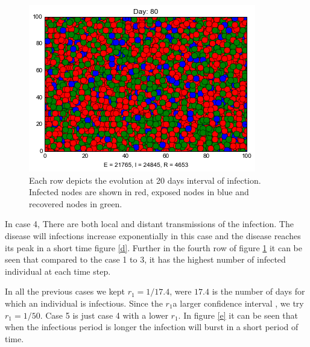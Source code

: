 \begin{figure}[h]
\includegraphics[scale=0.28]{images/5t80.png} 

\caption{Each row depicts the evolution at 20 days interval of infection. Infected nodes are shown in red, exposed nodes in blue and recovered nodes in green.}
\label{pics:res}
\end{figure}

In case 4, There are both local and distant transmissions of the infection. The disease will infections increase exponentially in this case and the disease reaches its peak in a short time figure \ref{d}. Further in the fourth row of figure \ref{pics:res} it can be seen that compared to the case 1 to 3, it has the highest number of infected individual at each time step.

In all the previous cases we kept $r_1 = 1/17.4$, were $17.4$ is the number of days for which an individual is infectious. Since the $r_1$a larger confidence interval \citep{lessler2016times}, we try  $r_1 = 1/50$. Case 5 is just case 4 with a lower $r_1$. In figure \ref{e} it can be seen that when the infectious period is longer the infection will burst in a short period of time.
